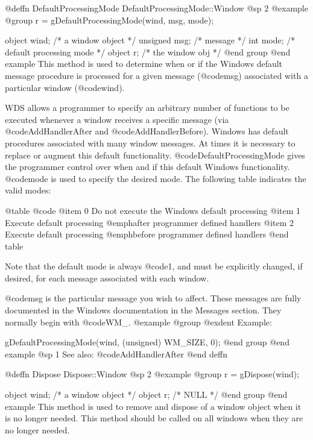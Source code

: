 @deffn {DefaultProcessingMode} DefaultProcessingMode::Window
@sp 2
@example
@group
r = gDefaultProcessingMode(wind, msg, mode);

object   wind;     /*  a window object          */
unsigned msg;      /*  message                  */
int      mode;     /*  default processing mode  */
object   r;        /*  the window obj           */
@end group
@end example
This method is used to determine when or if the Windows default message
procedure is processed for a given message (@code{msg}) associated with
a particular window (@code{wind}).

WDS allows a programmer to specify an arbitrary number of functions
to be executed whenever a window receives a specific message (via
@code{AddHandlerAfter} and @code{AddHandlerBefore}).  Windows has
default procedures associated with many window messages.  At times
it is necessary to replace or augment this default functionality.
@code{DefaultProcessingMode} gives the programmer control over when and
if this default Windows functionality.  @code{mode} is used to specify
the desired mode.  The following table indicates the valid modes:

@table @code
@item 0
Do not execute the Windows default processing
@item 1
Execute default processing @emph{after} programmer defined handlers
@item 2
Execute default processing @emph{before} programmer defined handlers
@end table

Note that the default mode is always @code{1}, and must be explicitly
changed, if desired, for each message associated with each window.

@code{msg} is the particular message you wish to affect.  These messages
are fully documented in the Windows documentation in the Messages
section.  They normally begin with @code{WM_}.
@example
@group
@exdent Example:

gDefaultProcessingMode(wind, (unsigned) WM_SIZE, 0);
@end group
@end example
@sp 1
See also:  @code{AddHandlerAfter}
@end deffn








@deffn {Dispose} Dispose::Window
@sp 2
@example
@group
r = gDispose(wind);

object  wind;   /*  a window object    */
object  r;      /*  NULL               */
@end group
@end example
This method is used to remove and dispose of a window object when it
is no longer needed.  This method should be called on all windows
when they are no longer needed.

